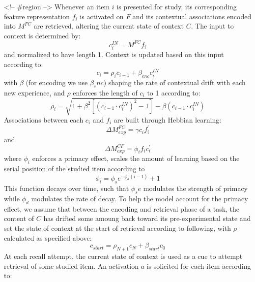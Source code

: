 {}<!-- #region -->\markdownRendererInterblockSeparator
{}\markdownRendererInterblockSeparator
{}Whenever an item $i$ is presented for study, its corresponding feature representation $f_i$ is activated on $F$ and its contextual associations encoded into $M^{FC}$ are retrieved, altering the current state of context $C$.\markdownRendererInterblockSeparator
{}The input to context is determined by:\markdownRendererInterblockSeparator
{}\begin{equation} \label{eq:3} c^{IN}_{i} = M^{FC}f_{i} \end{equation}\markdownRendererInterblockSeparator
{}and normalized to have length 1. Context is updated based on this input according to:\markdownRendererInterblockSeparator
{}$$c_i = \rho_ic_{i-1} + \beta_{enc} c_{i}^{IN}$$\markdownRendererInterblockSeparator
{}with $\beta$ (for encoding we use $\beta_enc$) shaping the rate of contextual drift with each new experience, and $\rho$ enforces the length of $c_i$ to 1 according to:\markdownRendererInterblockSeparator
{}$$\rho_i = \sqrt{1 + \beta^2\left[\left(c_{i-1} \cdot c^{IN}_i\right)^2 - 1\right]} - \beta\left(c_{i-1} \cdot c^{IN}_i\right)$$\markdownRendererInterblockSeparator
{}Associations between each $c_i$ and $f_i$ are built through Hebbian learning:\markdownRendererInterblockSeparator
{}$$\Delta M^{FC}_{exp} = \gamma c_i f^{'}_i$$\markdownRendererInterblockSeparator
{}and\markdownRendererInterblockSeparator
{}$$\Delta M^{CF}_{exp} = \phi_i f_i c^{'}_i$$\markdownRendererInterblockSeparator
{}where $\phi_i$ enforces a primacy effect, scales the amount of learning based on the serial position of the studied item according to\markdownRendererInterblockSeparator
{}$$\phi_i = \phi_se^{-\phi_d(i-1)} + 1$$\markdownRendererInterblockSeparator
{}This function decays over time, such that $\phi_se$ modulates the strength of primacy while $\phi_d$ modulates the rate of decay.\markdownRendererInterblockSeparator
{}\markdownRendererInterblockSeparator
{}To help the model account for the primacy effect, we assume that between the encoding and retrieval phase of a task, the content of $C$ has drifted some amoung back toward its pre-experimental state and set the state of context at the start of retrieval according to following, with $\rho$ calculated as specified above:\markdownRendererInterblockSeparator
{}$$c_{start} = \rho_{N+1}c_N + \beta_{start}c_0$$\markdownRendererInterblockSeparator
{}At each recall attempt, the current state of context is used as a cue to attempt retrieval of some studied item. An activation $a$ is solicited for each item according to:\markdownRendererInterblockSeparator
